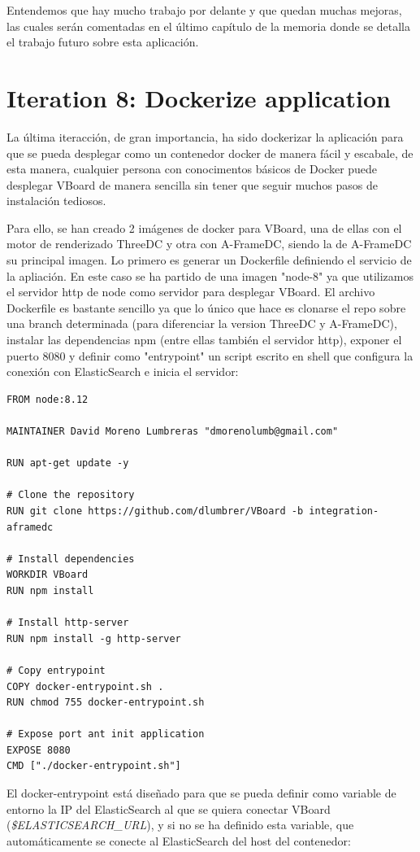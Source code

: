 \documentclass[a4paper, 12pt]{book}
\begin{document}
Entendemos que hay mucho trabajo por delante y que quedan muchas mejoras, las cuales serán comentadas en el último capítulo de la memoria donde se detalla el trabajo futuro sobre esta aplicación.

\section{Iteration 8: Dockerize application}
\label{sec:dockerize}

La última iteracción, de gran importancia, ha sido dockerizar la aplicación para que se pueda desplegar como un contenedor docker de manera fácil y escabale, de esta manera, cualquier persona con conocimentos básicos de Docker puede desplegar VBoard de manera sencilla sin tener que seguir muchos pasos de instalación tediosos.

Para ello, se han creado 2 imágenes de docker para VBoard, una de ellas con el motor de renderizado ThreeDC y otra con A-FrameDC, siendo la de A-FrameDC su principal imagen. Lo primero es generar un Dockerfile definiendo el servicio de la apliación. En este caso se ha partido de una imagen "node-8" ya que utilizamos el servidor http de node como servidor para desplegar VBoard. El archivo Dockerfile es bastante sencillo ya que lo único que hace es clonarse el repo sobre una branch determinada (para diferenciar la version ThreeDC y A-FrameDC), instalar las dependencias npm (entre ellas también el servidor http), exponer el puerto 8080 y definir como "entrypoint" un script escrito en shell que configura la conexión con ElasticSearch e inicia el servidor:

\begin{lstlisting}[frame=single]
FROM node:8.12

MAINTAINER David Moreno Lumbreras "dmorenolumb@gmail.com"

RUN apt-get update -y

# Clone the repository
RUN git clone https://github.com/dlumbrer/VBoard -b integration-aframedc

# Install dependencies
WORKDIR VBoard
RUN npm install

# Install http-server
RUN npm install -g http-server

# Copy entrypoint
COPY docker-entrypoint.sh .
RUN chmod 755 docker-entrypoint.sh

# Expose port ant init application
EXPOSE 8080
CMD ["./docker-entrypoint.sh"]
\end{lstlisting}

El docker-entrypoint está diseñado para que se pueda definir como variable de entorno la IP del ElasticSearch al que se quiera conectar VBoard (\textit{\$ELASTICSEARCH\_URL}), y si no se ha definido esta variable, que automáticamente se conecte al ElasticSearch del host del contenedor:
\end{document}
